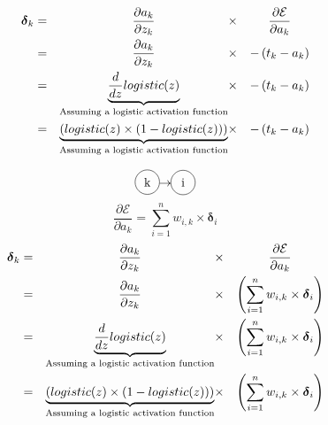 \documentclass[xcolor={table}]{beamer}
\newcommand*\circled[1]{\tikz[baseline=(char.base)]{
            \node[shape=circle,draw,inner sep=2pt,minimum size=20pt] (char) {#1};}}
\begin{document}
 \begin{frame} 
\begin{alignat}{5}
\boldsymbol{\delta}_k & = & \omit\hfill $\displaystyle \frac{\partial a_k}{\partial z_k}$\hfill & \times & \omit\hfill $\displaystyle \frac{\partial \mathcal{E}}{\partial a_k}$\hfill \notag \\
& = & \omit\hfill $\displaystyle \frac{\partial a_k}{\partial z_k}$\hfill & \times & {-}\left(t_k - a_k\right)  \notag \\
& = & \omit\hfill $\underbrace{\frac{d}{dz} logistic(z)}_{\text{Assuming a logistic activation function}}$\hfill & \times &  {-}\left(t_k - a_k\right) \notag \\
& = & \underbrace{\left( logistic(z) \times (1 - logistic(z)) \right)}_{\text{Assuming a logistic activation function}} & \times & {-}\left(t_k - a_k\right) 
\label{eq:deltaforoutput}
\end{alignat}
\end{frame} 



 \begin{frame} 
\begin{equation*}
\circled{k}\!\!\rightarrow\!\!\circled{i}
\end{equation*}
\begin{equation}
\frac{\partial \mathcal{E}}{\partial a_k}=\sum^n_{i=1} w_{i,k} \times \boldsymbol{\delta}_i
	\label{eqn:propagatingHiddenDeltas}
\end{equation}
\begin{alignat}{5}
\boldsymbol{\delta}_k & = & \omit\hfill $\displaystyle \frac{\partial a_k}{\partial z_k}$\hfill & \times & \omit\hfill $\displaystyle \frac{\partial \mathcal{E}}{\partial a_k}$\hfill \notag \\
& = & \omit\hfill $\displaystyle \frac{\partial a_k}{\partial z_k}$\hfill & \times & \left(\sum^n_{i=1} w_{i,k} \times \boldsymbol{\delta}_i \right)\notag \\
& = & \omit\hfill $\underbrace{\frac{d}{dz} logistic(z)}_{\text{Assuming a logistic activation function}}$\hfill & \times &  \left(\sum^n_{i=1} w_{i,k} \times \boldsymbol{\delta}_i \right)\notag \\
& = & \underbrace{\left( logistic(z) \times (1 - logistic(z)) \right)}_{\text{Assuming a logistic activation function}} & \times & \left(\sum^n_{i=1} w_{i,k} \times \boldsymbol{\delta}_i\right) 
\label{eq:deltaforhidden}
\end{alignat}
\end{frame} 
\end{document}
